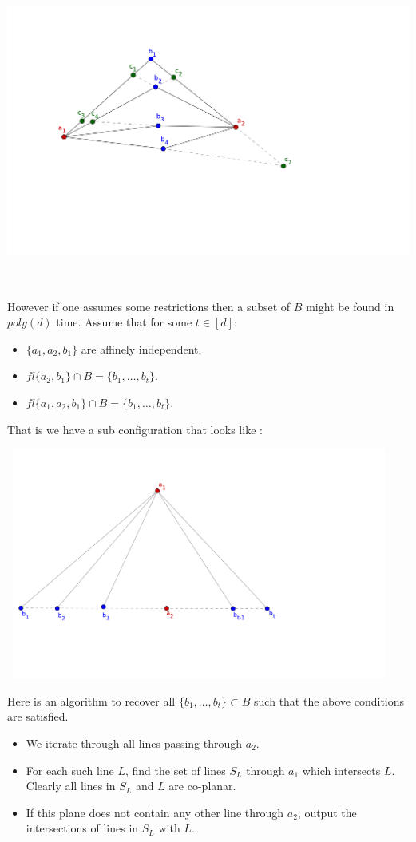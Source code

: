 \documentclass[letterpaper,USenglish,numberwithinsect]{lipics}
\begin{document}
\includegraphics[width=6in,height=4in]{pointconfig.png}

 However if one assumes some restrictions then a subset of $B$ might be found in $poly(d)$ time. Assume that for some $t\in [d]$:
 \begin{itemize}
 \item $\{a_1,a_2,b_1\}$ are affinely independent.
  \item $fl\{a_2,b_1\} \cap B = \{b_1,\ldots,b_t\}$.
  \item $fl\{a_1,a_2,b_1\}\cap B = \{b_1,\ldots,b_t\}$.
 \end{itemize}

 That is we have a sub configuration that looks like :

\includegraphics[height=3in, width=5in]{subconfig.png}


Here is an algorithm to recover all $\{b_1,\ldots,b_t\}\subset B$ such that the above conditions are satisfied.
\begin{itemize}
 \item We iterate through all lines passing through $a_2$.
 \item For each such line $L$, find the set of lines $S_{L}$ through $a_1$ which intersects $L$. Clearly all lines
 in $S_L$ and $L$ are co-planar.
 \item If this plane does not contain any other line through $a_2$, output the intersections of lines in $S_L$ with $L$.
\end{itemize}
\end{document}
